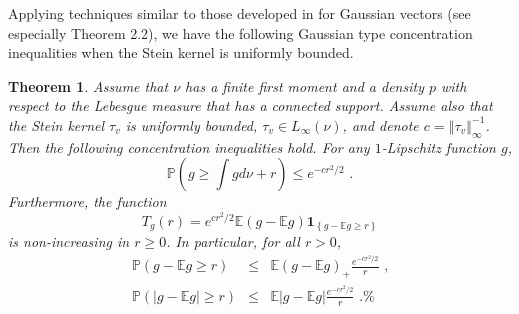 \documentclass[11pt]{article}
\newtheorem{theorem}{Theorem}
\begin{document}
Applying techniques similar to those developed in \cite{MR1836739} for
Gaussian vectors (see especially Theorem 2.2), we have the following
Gaussian type concentration inequalities when the Stein kernel is uniformly
bounded.

\begin{theorem}
\label{theorem_Mills_type_Gauss}Assume that $\nu $ has a finite first moment
and a density $p$ with respect to the Lebesgue measure that has a connected
support. Assume also that the Stein kernel $\tau _{v}$ is uniformly bounded, 
$\tau _{v}\in L_{\infty }\left( \nu \right) $, and denote $c=\left\Vert \tau
_{v}\right\Vert _{\infty }^{-1}$. Then the following concentration
inequalities hold. For any $1$-Lipschitz function $g$,%
\begin{equation}
\mathbb{P}\left( g\geq \int gd\nu +r\right) \leq e^{-cr^{2}/2}\text{ .}
\label{Gaussian_type_concen}
\end{equation}%
Furthermore, the function%
\begin{equation*}
T_{g}\left( r\right) =e^{cr^{2}/2}\mathbb{E}\left( g-\mathbb{E}g\right) 
\mathbf{1}_{\left\{ g-\mathbb{E}g\geq r\right\} }
\end{equation*}%
is non-increasing in $r\geq 0$. In particular, for all $r>0$,%
\begin{eqnarray}
\mathbb{P}\left( g-\mathbb{E}g\geq r\right) &\leq &\mathbb{E}\left( g-%
\mathbb{E}g\right) _{+}\frac{e^{-cr^{2}/2}}{r}\text{ ,}
\label{concen_ref_gauss} \\
\mathbb{P}\left( \left\vert g-\mathbb{E}g\right\vert \geq r\right) &\leq &%
\mathbb{E}\left\vert g-\mathbb{E}g\right\vert \frac{e^{-cr^{2}/2}}{r}\text{ .%
}  \label{concen_ref_Gauss_abs}
\end{eqnarray}
\end{theorem}
\end{document}
